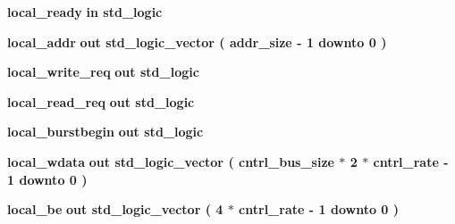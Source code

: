 \begin{DoxyCompactItemize}
\item 
{\bf local\+\_\+ready}  {\bfseries {\bfseries \textcolor{keywordflow}{in}\textcolor{vhdlchar}{ }}} {\bfseries \textcolor{comment}{std\+\_\+logic}\textcolor{vhdlchar}{ }} 
\item 
{\bf local\+\_\+addr}  {\bfseries {\bfseries \textcolor{keywordflow}{out}\textcolor{vhdlchar}{ }}} {\bfseries \textcolor{comment}{std\+\_\+logic\+\_\+vector}\textcolor{vhdlchar}{ }\textcolor{vhdlchar}{(}\textcolor{vhdlchar}{ }\textcolor{vhdlchar}{ }\textcolor{vhdlchar}{ }\textcolor{vhdlchar}{ }{\bfseries {\bf addr\+\_\+size}} \textcolor{vhdlchar}{-\/}\textcolor{vhdlchar}{ } \textcolor{vhdldigit}{1} \textcolor{vhdlchar}{ }\textcolor{keywordflow}{downto}\textcolor{vhdlchar}{ }\textcolor{vhdlchar}{ } \textcolor{vhdldigit}{0} \textcolor{vhdlchar}{ }\textcolor{vhdlchar}{)}\textcolor{vhdlchar}{ }} 
\item 
{\bf local\+\_\+write\+\_\+req}  {\bfseries {\bfseries \textcolor{keywordflow}{out}\textcolor{vhdlchar}{ }}} {\bfseries \textcolor{comment}{std\+\_\+logic}\textcolor{vhdlchar}{ }} 
\item 
{\bf local\+\_\+read\+\_\+req}  {\bfseries {\bfseries \textcolor{keywordflow}{out}\textcolor{vhdlchar}{ }}} {\bfseries \textcolor{comment}{std\+\_\+logic}\textcolor{vhdlchar}{ }} 
\item 
{\bf local\+\_\+burstbegin}  {\bfseries {\bfseries \textcolor{keywordflow}{out}\textcolor{vhdlchar}{ }}} {\bfseries \textcolor{comment}{std\+\_\+logic}\textcolor{vhdlchar}{ }} 
\item 
{\bf local\+\_\+wdata}  {\bfseries {\bfseries \textcolor{keywordflow}{out}\textcolor{vhdlchar}{ }}} {\bfseries \textcolor{comment}{std\+\_\+logic\+\_\+vector}\textcolor{vhdlchar}{ }\textcolor{vhdlchar}{(}\textcolor{vhdlchar}{ }\textcolor{vhdlchar}{ }\textcolor{vhdlchar}{ }\textcolor{vhdlchar}{ }{\bfseries {\bf cntrl\+\_\+bus\+\_\+size}} \textcolor{vhdlchar}{$\ast$}\textcolor{vhdlchar}{ } \textcolor{vhdldigit}{2} \textcolor{vhdlchar}{$\ast$}\textcolor{vhdlchar}{ }\textcolor{vhdlchar}{ }\textcolor{vhdlchar}{ }{\bfseries {\bf cntrl\+\_\+rate}} \textcolor{vhdlchar}{-\/}\textcolor{vhdlchar}{ } \textcolor{vhdldigit}{1} \textcolor{vhdlchar}{ }\textcolor{keywordflow}{downto}\textcolor{vhdlchar}{ }\textcolor{vhdlchar}{ } \textcolor{vhdldigit}{0} \textcolor{vhdlchar}{ }\textcolor{vhdlchar}{)}\textcolor{vhdlchar}{ }} 
\item 
{\bf local\+\_\+be}  {\bfseries {\bfseries \textcolor{keywordflow}{out}\textcolor{vhdlchar}{ }}} {\bfseries \textcolor{comment}{std\+\_\+logic\+\_\+vector}\textcolor{vhdlchar}{ }\textcolor{vhdlchar}{(}\textcolor{vhdlchar}{ }\textcolor{vhdlchar}{ } \textcolor{vhdldigit}{4} \textcolor{vhdlchar}{$\ast$}\textcolor{vhdlchar}{ }\textcolor{vhdlchar}{ }\textcolor{vhdlchar}{ }{\bfseries {\bf cntrl\+\_\+rate}} \textcolor{vhdlchar}{-\/}\textcolor{vhdlchar}{ } \textcolor{vhdldigit}{1} \textcolor{vhdlchar}{ }\textcolor{keywordflow}{downto}\textcolor{vhdlchar}{ }\textcolor{vhdlchar}{ } \textcolor{vhdldigit}{0} \textcolor{vhdlchar}{ }\textcolor{vhdlchar}{)}\textcolor{vhdlchar}{ }} 

\end{DoxyCompactItemize}

